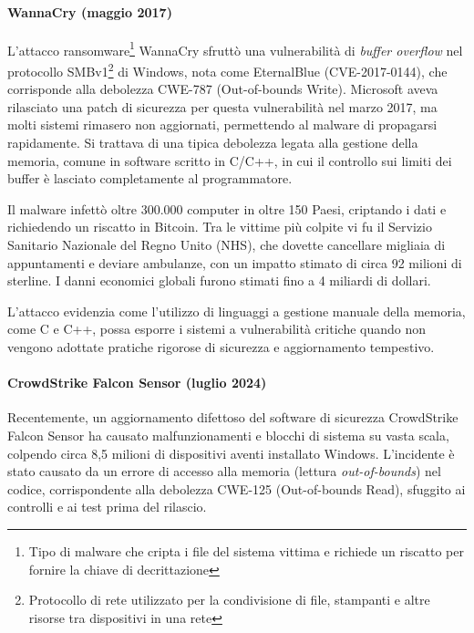 \paragraph{WannaCry (maggio 2017)}

L'attacco ransomware\footnote{Tipo di malware che cripta i file del sistema
vittima e richiede un riscatto per fornire la chiave di decrittazione} WannaCry
sfruttò una vulnerabilità di \textit{buffer overflow} nel protocollo SMBv1\footnote{Protocollo
di rete utilizzato per la condivisione di file, stampanti e altre risorse tra dispositivi
in una rete} di Windows, nota come EternalBlue (CVE-2017-0144), che corrisponde
alla debolezza CWE-787 (Out-of-bounds Write). Microsoft aveva rilasciato una patch
di sicurezza per questa vulnerabilità nel marzo 2017, ma molti sistemi rimasero
non aggiornati, permettendo al malware di propagarsi rapidamente. Si trattava di
una tipica debolezza legata alla gestione della memoria, comune in software scritto
in C/C++, in cui il controllo sui limiti dei buffer è lasciato completamente al
programmatore.

Il malware infettò oltre 300.000 computer in oltre 150 Paesi, criptando i dati e
richiedendo un riscatto in Bitcoin. Tra le vittime più colpite vi fu il Servizio
Sanitario Nazionale del Regno Unito (NHS), che dovette cancellare migliaia di appuntamenti
e deviare ambulanze, con un impatto stimato di circa 92 milioni di sterline. I danni
economici globali furono stimati fino a 4 miliardi di dollari.\cite{wannacry_kaspersky}

L'attacco evidenzia come l'utilizzo di linguaggi a gestione manuale della
memoria, come C e C++, possa esporre i sistemi a vulnerabilità critiche quando
non vengono adottate pratiche rigorose di sicurezza e aggiornamento tempestivo.

\paragraph{CrowdStrike Falcon Sensor (luglio 2024)}

Recentemente, un aggiornamento difettoso del software di sicurezza CrowdStrike Falcon
Sensor ha causato malfunzionamenti e blocchi di sistema su vasta scala, colpendo
circa 8,5 milioni di dispositivi aventi installato Windows. L'incidente è stato causato
da un errore di accesso alla memoria (lettura \textit{out-of-bounds}) nel codice,
corrispondente alla debolezza CWE-125 (Out-of-bounds Read), sfuggito ai
controlli e ai test prima del rilascio.

